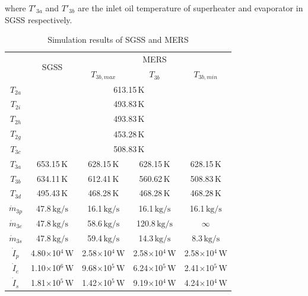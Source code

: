 where $T'_{3a}$ and $T'_{3b}$ are the inlet oil temperature of superheater and evaporator in SGSS respectively.
\begin{table}[htbp]
	\caption{Simulation results of SGSS and MERS}
	\begin{center}
	\begin{tabular}{ccccc}
		\toprule
		& \multirow{2}{*}{SGSS} & \multicolumn{3}{c}{MERS}\\\cline{3-5}
 &  & $T_{3b,max}$ & $T_{3b}$ & $T_{3b,min}$\\
		\midrule
		$T_{2a}$ & \multicolumn{4}{c}{613.15$\,\mathrm{K}$}\\
		$T_{2i}$ & \multicolumn{4}{c}{493.83$\,\mathrm{K}$}\\
		$T_{2h}$ & \multicolumn{4}{c}{493.83$\,\mathrm{K}$}\\
		$T_{2g}$ & \multicolumn{4}{c}{453.28$\,\mathrm{K}$}\\
		$T_{3c}$ & \multicolumn{4}{c}{508.83$\,\mathrm{K}$}\\
		$T_{3a}$	&	653.15$\,\mathrm{K}$
	&	628.15$\,\mathrm{K}$	&	628.15$\,\mathrm{K}$	&	628.15$\,\mathrm{K}$\\
		$T_{3b}$	&	634.11$\,\mathrm{K}$	&	612.41$\,\mathrm{K}$	&	560.62$\,\mathrm{K}$	&	508.83$\,\mathrm{K}$\\
		$T_{3d}$	&	495.43$\,\mathrm{K}$
	&	468.28$\,\mathrm{K}$	&	468.28$\,\mathrm{K}$	&	468.28$\,\mathrm{K}$\\
		$\dot{m}_{3p}$	&	47.8$\,\mathrm{kg/s}$	&	16.1$\,\mathrm{kg/s}$	&	16.1$\,\mathrm{kg/s}$	&	16.1$\,\mathrm{kg/s}$\\
		$\dot{m}_{3e}$	&	47.8$\,\mathrm{kg/s}$	&	58.6$\,\mathrm{kg/s}$	&	120.8$\,\mathrm{kg/s}$	&	$\infty$\\
		$\dot{m}_{3s}$	&	47.8$\,\mathrm{kg/s}$	&	59.4$\,\mathrm{kg/s}$	&	14.3$\,\mathrm{kg/s}$	&	8.3$\,\mathrm{kg/s}$\\
		$\dot{I}_p$    &    4.80$\times$10$^4\,\mathrm{W}$    	&  2.58$\times$10$^4\,\mathrm{W}$  &	2.58$\times$10$^4\,\mathrm{W}$	&	2.58$\times$10$^4\,\mathrm{W}$\\
		$\dot{I}_e$    &    1.10$\times$10$^6\,\mathrm{W}$    	&  9.68$\times$10$^5\,\mathrm{W}$  &	6.24$\times$10$^5\,\mathrm{W}$	&	2.41$\times$10$^5\,\mathrm{W}$	\\
		$\dot{I}_s$    &    1.81$\times$10$^5\,\mathrm{W}$    	&  1.42$\times$10$^5\,\mathrm{W}$  &	9.19$\times$10$^4\,\mathrm{W}$	&	4.24$\times$10$^4\,\mathrm{W}$\\

\end{tabular}
\end{center}
\end{table}
